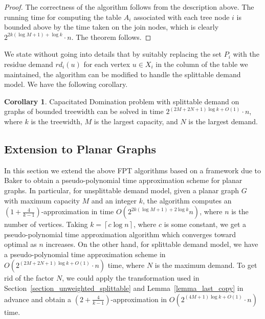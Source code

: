 \documentclass[a4paper,11pt]{article}
\theoremstyle{definition}
\newtheorem{corollary}[theorem]{Corollary}
\begin{document}
\begin{proof}
The correctness of the algorithm follows from the description above. The running time for computing the table $A_i$ associated with each tree node $i$ is bounded above by the time taken on the join nodes, which is clearly $2^{2k(\log M +1)+\log k}\cdot n$. The theorem follows.
\end{proof}

\smallskip

We state without going into details that by suitably replacing the set $P_i$ with the residue demand $rd_i(u)$ for each vertex $u \in X_i$ in the column of the table we maintained, the algorithm can be modified to handle the splittable demand model. We have the following corollary.

\begin{corollary}
Capacitated Domination problem with splittable demand on graphs of bounded treewidth can be solved in time $2^{(2M+2N+1)\log k+O(1)}\cdot n$, where $k$ is the treewidth, $M$ is the largest capacity, and $N$ is the largest demand.
\end{corollary}



\subsection{Extension to Planar Graphs}

In this section we extend the above FPT algorithms based on a framework due to Baker \cite{174650} to obtain a pseudo-polynomial time approximation scheme for planar graphs. In particular, for unsplittable demand model, given a planar graph $G$ with maximum capacity $M$ and an integer $k$, the algorithm computes an $(1+\frac{4}{k-1})$-approximation in time $O(2^{2k(\log M+1)+2\log k}n)$, where $n$ is the number of vertices. Taking $k = \left\lceil c\log n\right\rceil$, where $c$ is some constant, we get a pseudo-polynomial time approximation algorithm which converges toward optimal as $n$ increases. On the other hand, for splittable demand model, we have a pseudo-polynomial time approximation scheme in $O(2^{(2M+2N+1)\log k+O(1)}\cdot n)$ time, where $N$ is the maximum demand. To get rid of the factor $N$, we could apply the transformation used in Section~\ref{section_unweighted_splittable} and Lemma~\ref{lemma_last_copy} in advance and obtain a $(2+\frac{4}{k-1})$-approximation in $O(2^{(4M+1)\log k+O(1)}\cdot n)$ time.

\smallskip
\end{document}

